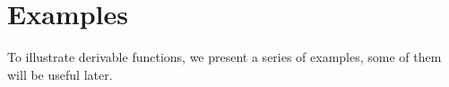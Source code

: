 
\section{Examples}\label{sec:AppendixExamples}

%
%
%    
%
To illustrate derivable functions, we present a series of examples, some of them will be useful later.



